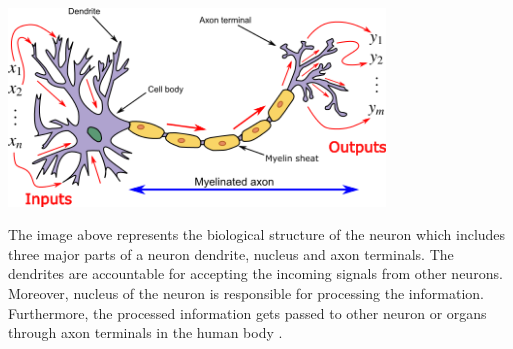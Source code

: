 \vspace{3mm}
\begin{center}
    \includegraphics[width=10cm]{Images/neuron.png}
\end{center}

The image above represents the biological structure of the neuron which includes three major parts of a neuron dendrite, nucleus and axon terminals.
The dendrites are accountable for accepting the incoming signals from other neurons. 
Moreover, nucleus of the neuron is responsible for processing the information. 
Furthermore, the processed information gets passed to other neuron or organs through axon terminals 
in the human body \citep{AGATONOVICKUSTRIN2000717}. 
